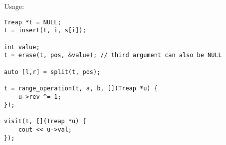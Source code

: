 Usage:
\begin{lstlisting}
Treap *t = NULL;
t = insert(t, i, s[i]);

int value;
t = erase(t, pos, &value); // third argument can also be NULL

auto [l,r] = split(t, pos);

t = range_operation(t, a, b, [](Treap *u) {
	u->rev ^= 1;
});

visit(t, [](Treap *u) {
	cout << u->val;
});
\end{lstlisting}

